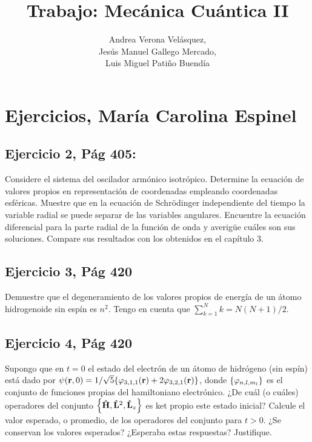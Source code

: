 \documentclass[
course = {{Mecánica Cuántica II}}
]{aga-homework}
\begin{document}
\title{\vspace{-30pt}Trabajo: Mecánica Cuántica II}

\author{Andrea Verona Velásquez,\\
Jesús Manuel Gallego Mercado,\\
Luis Miguel Patiño Buendía}

\maketitle

\section*{Ejercicios, María Carolina Espinel}
\subsection*{Ejercicio 2, Pág 405:} Considere el sistema del oscilador armónico isotrópico. Determine la ecuación de valores propios en representación de coordenadas empleando coordenadas esféricas. Muestre que en la ecuación de Schrödinger independiente del tiempo la variable radial se puede separar de las variables angulares. Encuentre la ecuación diferencial para la parte radial de la función de onda y averigüe cuáles son sus soluciones. Compare sus resultados con los obtenidos en el capítulo 3.

\subsection*{Ejercicio 3, Pág 420}
Demuestre que el degeneramiento de los valores propios de energía de un átomo hidrogenoide sin espín es $n^2$. Tengo en cuenta que $\sum_{k=1}^{N} k = N(N+1)/2$.

\subsection*{Ejercicio 4, Pág 420}
Supongo que en $t=0$ el estado del electrón de un átomo de hidrógeno (sin espín) está dado por $\psi(\vb{r}, 0)=1/\sqrt{5}\qty{\varphi_{3,1,1}(\vb{r})+2\varphi_{3,2,1}(\vb{r})}$, donde $\qty{\varphi_{n,l,m_{l}}}$ es el conjunto de funciones propias del hamiltoniano electrónico. ¿De cuál (o cuáles) operadores del conjunto $\qty{\vu{H},\vu{L}^2, \vu{L}_z}$ es ket propio este estado inicial? Calcule el valor esperado, o promedio, de los operadores del conjunto para $t>0$. ¿Se conservan los valores esperados? ¿Esperaba estas respuestas? Justifique.
\end{document}
